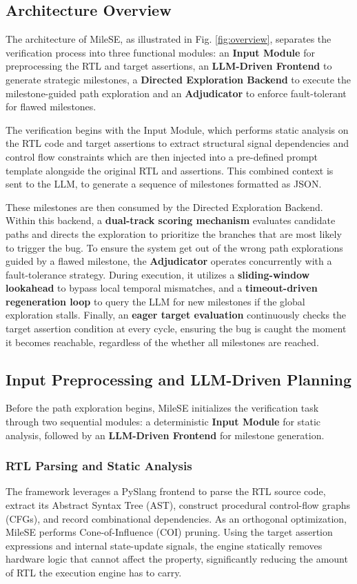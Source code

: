 \documentclass[conference]{IEEEtran}
\begin{document}
\subsection{Architecture Overview}
The architecture of MileSE, as illustrated in Fig. \ref{fig:overview}, separates the verification process into three functional modules: an \textbf{Input Module} for preprocessing the RTL and target assertions, an \textbf{LLM-Driven Frontend} to generate strategic milestones, a \textbf{Directed Exploration Backend} to execute the milestone-guided path exploration and an \textbf{Adjudicator} to enforce fault-tolerant for flawed milestones. %

The verification begins with the Input Module, which performs static analysis on the RTL code and target assertions to extract structural signal dependencies and control flow constraints which are then injected into a pre-defined prompt template alongside the original RTL and assertions. This combined context is sent to the LLM, to generate a sequence of milestones formatted as JSON.

These milestones are then consumed by the Directed Exploration Backend. Within this backend, a \textbf{dual-track scoring mechanism} evaluates candidate paths and directs the exploration to prioritize the branches that are most likely to trigger the bug. To ensure the system get out of the wrong path explorations guided by a flawed milestone, the \textbf{Adjudicator} operates concurrently with a fault-tolerance strategy. During execution, it utilizes a \textbf{sliding-window lookahead} to bypass local temporal mismatches, and a \textbf{timeout-driven regeneration loop} to query the LLM for new milestones if the global exploration stalls. Finally, an \textbf{eager target evaluation} continuously checks the target assertion condition at every cycle, ensuring the bug is caught the moment it becomes reachable, regardless of the whether all milestones are reached.

\subsection{Input Preprocessing and LLM-Driven Planning}
Before the path exploration begins, MileSE initializes the verification task through two sequential modules: a deterministic \textbf{Input Module} for static analysis, followed by an \textbf{LLM-Driven Frontend} for milestone generation.

\subsubsection{RTL Parsing and Static Analysis}
The framework leverages a PySlang frontend to parse the RTL source code, extract its Abstract Syntax Tree (AST), construct procedural control-flow graphs (CFGs), and record combinational dependencies. As an orthogonal optimization, MileSE performs Cone-of-Influence (COI) pruning. Using the target assertion expressions and internal state-update signals, the engine statically removes hardware logic that cannot affect the property, significantly reducing the amount of RTL the execution engine has to carry.
\end{document}
